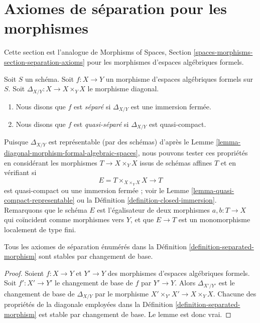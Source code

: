 \section{Axiomes de séparation pour les morphismes}
\label{section-separation-axioms}

\noindent
Cette section est l'analogue de
Morphisms of Spaces, Section \ref{spaces-morphisms-section-separation-axioms}
pour les morphismes d'espaces algébriques formels.

\begin{definition}
\label{definition-separated-morphism}
Soit $S$ un schéma.
Soit $f : X \to Y$ un morphisme d'espaces algébriques formels sur $S$.
Soit $\Delta_{X/Y} : X \to X \times_Y X$ le morphisme diagonal.
\begin{enumerate}
\item Nous disons que $f$ est {\it séparé} si $\Delta_{X/Y}$ est une immersion fermée.
\item Nous disons que $f$ est {\it quasi-séparé} si $\Delta_{X/Y}$ est quasi-compact.
\end{enumerate}
\end{definition}

\noindent
Puisque $\Delta_{X/Y}$ est représentable (par des schémas) d'après le
Lemme \ref{lemma-diagonal-morphism-formal-algebraic-spaces},
nous pouvons tester ces propriétés en considérant les morphismes $T \to X \times_Y X$
issus de schémas affines $T$ et en vérifiant si
$$
E = T \times_{X \times_Y X} X \longrightarrow T
$$
est quasi-compact ou une immersion fermée ; voir le
Lemme \ref{lemma-quasi-compact-representable} ou la
Définition \ref{definition-closed-immersion}.
Remarquons que le schéma $E$ est l'égalisateur de deux morphismes
$a, b : T \to X$ qui coïncident comme morphismes vers $Y$,
et que $E \to T$ est un monomorphisme localement de type fini.

\begin{lemma}
\label{lemma-base-change-separated}
Tous les axiomes de séparation énumérés dans la
Définition \ref{definition-separated-morphism}
sont stables par changement de base.
\end{lemma}

\begin{proof}
Soient $f : X \to Y$ et $Y' \to Y$ des morphismes d'espaces algébriques formels.
Soit $f' : X' \to Y'$ le changement de base de $f$ par $Y' \to Y$. Alors
$\Delta_{X'/Y'}$ est le changement de base de $\Delta_{X/Y}$ par
le morphisme $X' \times_{Y'} X' \to X \times_Y X$. Chacune des propriétés
de la diagonale employées dans la Définition \ref{definition-separated-morphism}
est stable par changement de base. Le lemme est donc vrai.
\end{proof}

